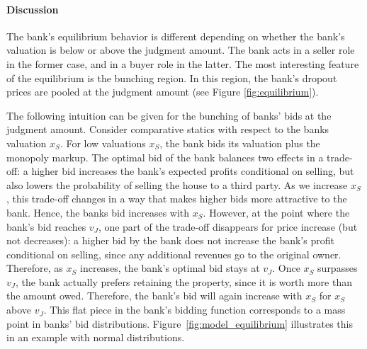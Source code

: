 \documentclass[11pt,twopage]{article}
\begin{document}
\paragraph{Discussion} The bank's equilibrium behavior is different
depending on whether the bank's valuation is below or above the
judgment amount. The bank acts in a seller role in the former case,
and in a buyer role in the latter. The most interesting feature of the
equilibrium is the bunching region. In this region, the bank's dropout
prices are pooled at the judgment amount (see Figure
\ref{fig:equilibrium}).

The following intuition can be given for the bunching of banks' bids
at the judgment amount. Consider comparative statics with respect to
the banks valuation $x_S$. For low valuations $x_S$, the bank bids its
valuation plus the monopoly markup. The optimal bid of the bank
balances two effects in a trade-off: a higher bid increases the bank's
expected profits conditional on selling, but also lowers the
probability of selling the house to a third party. As we increase
$x_S$, this trade-off changes in a way that makes higher bids more
attractive to the bank. Hence, the banks bid increases with
$x_S$. However, at the point where the bank's bid reaches $v_J$, one
part of the trade-off disappears for price increase (but not
decreases): a higher bid by the bank does not increase the bank's
profit conditional on selling, since any additional revenues go to the
original owner. Therefore, as $x_S$ increases, the bank's optimal bid
stays at $v_J$. Once $x_S$ surpasses $v_J$, the bank actually prefers
retaining the property, since it is worth more than the amount
owed. Therefore, the bank's bid will again increase with $x_S$ for
$x_S$ above $v_J$.
%
This flat piece in the bank's bidding function corresponds to a mass
point in banks' bid distributions.  Figure~\ref{fig:model_equilibrium}
illustrates this in an example with normal distributions.
\end{document}
